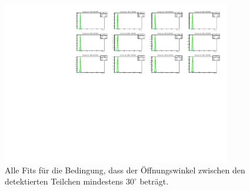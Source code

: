 \documentclass[a4paper,11pt,oneside,final,german,openbib,pdftex]{scrbook}
\begin{document}
{\begin{appendix}
\begin{figure}[h!]
	\begin{center}
		\includegraphics[width=100mm]{NewCalib/20171904SimMinOpeningAngleAllFits}
		\caption{Alle Fits f\"ur die Bedingung, dass der \"Offnungswinkel zwischen den detektierten Teilchen mindestens $30^{\circ}$ betr\"agt.}
		\label{fig:Relative-Abweichung-Min-Opening-Angle-AllFits}
	\end{center}
\end{figure}



\listoffigures



\listoftables




\end{appendix}}
\end{document}
